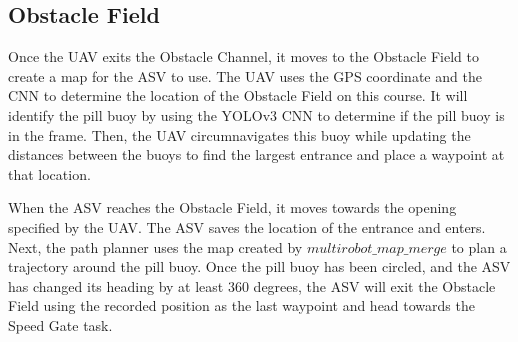 \documentclass[letterpaper, 12 pt, conference]{ieeeconf}
\begin{document}
\subsection{Obstacle Field}
\label{ObstacleField}
% 
Once the UAV exits the Obstacle Channel, it moves to the Obstacle Field to create a map for the ASV to use. The UAV uses the GPS coordinate and the CNN to determine the location of the Obstacle Field on this course. It will identify the pill buoy by using the YOLOv3 CNN to determine if the pill buoy is in the frame. Then, the UAV circumnavigates this buoy while updating the distances between the buoys to find the largest entrance and place a waypoint at that location. 

When the ASV reaches the Obstacle Field, it moves towards the opening specified by the UAV. The ASV saves the location of the entrance and enters. Next, the path planner uses the map created by $multirobot\_map\_merge$ to plan a trajectory around the pill buoy. Once the pill buoy has been circled, and the ASV has changed its heading by at least 360 degrees, the ASV will exit the Obstacle Field using the recorded position as the last waypoint and head towards the Speed Gate task. 
% 
\end{document}
